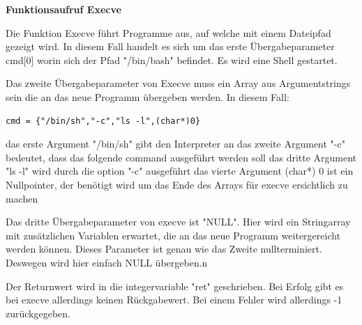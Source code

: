 \documentclass[12pt]{article}
\begin{document}
\textbf{Funktionsaufruf Execve}

Die Funktion Execve führt Programme aus, auf welche mit einem Dateipfad gezeigt wird.
In diesem Fall handelt es sich um das erste Übergabeparameter cmd[0]
worin sich der Pfad "/bin/bash" befindet. Es wird eine Shell gestartet.


Das zweite Übergabeparameter von Execve muss ein Array aus Argumentstrings sein
die an das neue Programm übergeben werden. In diesem Fall:

\begin{lstlisting}
cmd = {"/bin/sh","-c","ls -l",(char*)0}
\end{lstlisting}
das erste Argument "/bin/sh" gibt den Interpreter  an
das zweite Argument "-c" bedeutet, dass das folgende command ausgeführt werden soll
das dritte Argument "ls -l" wird durch die option "-c" ausgeführt
das vierte Argument (char*) 0 ist ein Nullpointer, der benötigt wird
um das Ende des Arrays für execve ersichtlich zu machen

Das dritte Übergabeparameter von execve ist "NULL".
Hier wird ein Stringarray mit zusätzlichen Variablen erwartet, die an
das neue Programm weitergereicht werden können.
Dieses Parameter ist genau wie das Zweite nullterminiert.
Deswegen wird hier einfach NULL übergeben.n


Der Returnwert wird in die integervariable "ret" geschrieben.
Bei Erfolg gibt es bei  execve allerdings keinen Rückgabewert.
Bei einem Fehler wird allerdings -1 zurückgegeben.
\end{document}
